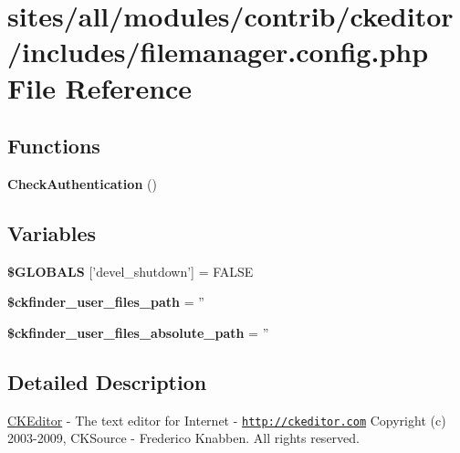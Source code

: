 \hypertarget{filemanager_8config_8php}{
\section{sites/all/modules/contrib/ckeditor/includes/filemanager.config.php File Reference}
\label{filemanager_8config_8php}
}
\subsection*{Functions}
\begin{CompactItemize}
\item 
\hypertarget{filemanager_8config_8php_b718a1bfe278d2a75b1aada377e9b75a}{
\textbf{CheckAuthentication} ()}
\label{filemanager_8config_8php_b718a1bfe278d2a75b1aada377e9b75a}

\end{CompactItemize}
\subsection*{Variables}
\begin{CompactItemize}
\item 
\hypertarget{filemanager_8config_8php_6619b5fd8f02b9ad700c1ec617b9dcf6}{
\textbf{\$GLOBALS} \mbox{[}'devel\_\-shutdown'\mbox{]} = FALSE}
\label{filemanager_8config_8php_6619b5fd8f02b9ad700c1ec617b9dcf6}

\item 
\hypertarget{filemanager_8config_8php_6696d743a759458d4927f95965984021}{
\textbf{\$ckfinder\_\-user\_\-files\_\-path} = ''}
\label{filemanager_8config_8php_6696d743a759458d4927f95965984021}

\item 
\hypertarget{filemanager_8config_8php_d9a626d8a3e44915ad7bd32591df8d8c}{
\textbf{\$ckfinder\_\-user\_\-files\_\-absolute\_\-path} = ''}
\label{filemanager_8config_8php_d9a626d8a3e44915ad7bd32591df8d8c}

\end{CompactItemize}


\subsection{Detailed Description}
\hyperlink{classCKEditor}{CKEditor} - The text editor for Internet - \href{http://ckeditor.com}{\tt http://ckeditor.com} Copyright (c) 2003-2009, CKSource - Frederico Knabben. All rights reserved.


